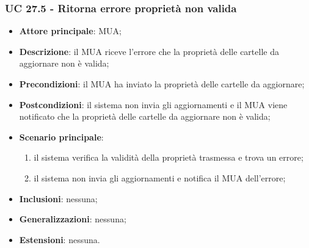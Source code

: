     \subsubsection{UC 27.5 - Ritorna errore proprietà non valida} \label{sec:UC27.5}
    \begin{itemize}
        \item \textbf{Attore principale}: MUA;
        \item \textbf{Descrizione}: il MUA riceve l'errore che la proprietà delle cartelle da aggiornare non è valida;
        \item \textbf{Precondizioni}: il MUA ha inviato la proprietà delle cartelle da aggiornare;
        \item \textbf{Postcondizioni}: il sistema non invia gli aggiornamenti e il MUA viene notificato che la proprietà delle cartelle da aggiornare non è valida;
        \item \textbf{Scenario principale}:
            \begin{enumerate}
                \item il sistema verifica la validità della proprietà trasmessa e trova un errore;
                \item il sistema non invia gli aggiornamenti e notifica il MUA dell'errore;
            \end{enumerate}
        \item \textbf{Inclusioni}: nessuna;
        \item \textbf{Generalizzazioni}: nessuna;
        \item \textbf{Estensioni}: nessuna.
    \end{itemize}